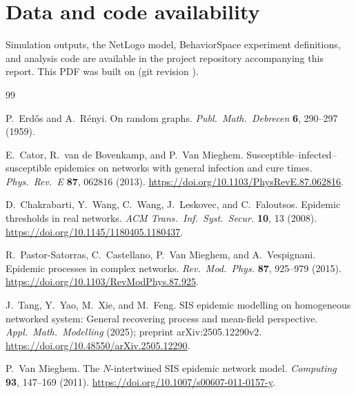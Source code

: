 \documentclass[11pt,a4paper]{article}
\begin{document}
\section*{Data and code availability}
\label{sec:data-availability}
{}

Simulation outputs, the NetLogo model, BehaviorSpace experiment definitions, and analysis code are available in the project repository accompanying this report.
This PDF was built on \RepReportDate{} (git revision \texttt{\RepGitHash}\RepRepoUrlPhrase{}).

\begin{thebibliography}{99}

P.~Erd\H{o}s and A.~R\'enyi.
\newblock On random graphs.
\newblock \emph{Publ.\ Math.\ Debrecen} \textbf{6}, 290--297 (1959).

E.~Cator, R.~van de Bovenkamp, and P.~Van Mieghem.
\newblock Susceptible--infected--susceptible epidemics on networks with general infection and cure times.
\newblock \emph{Phys.\ Rev.\ E} \textbf{87}, 062816 (2013).
\newblock \url{https://doi.org/10.1103/PhysRevE.87.062816}.

D.~Chakrabarti, Y.~Wang, C.~Wang, J.~Leskovec, and C.~Faloutsos.
\newblock Epidemic thresholds in real networks.
\newblock \emph{ACM Trans.\ Inf.\ Syst.\ Secur.} \textbf{10}, 13 (2008).
\newblock \url{https://doi.org/10.1145/1180405.1180437}.


R.~Pastor-Satorras, C.~Castellano, P.~Van Mieghem, and A.~Vespignani.
\newblock Epidemic processes in complex networks.
\newblock \emph{Rev.\ Mod.\ Phys.} \textbf{87}, 925--979 (2015).
\newblock \url{https://doi.org/10.1103/RevModPhys.87.925}.


J.~Tang, Y.~Yao, M.~Xie, and M.~Feng.
\newblock SIS epidemic modelling on homogeneous networked system: General recovering process and mean-field perspective.
\newblock \emph{Appl.\ Math.\ Modelling} (2025); preprint arXiv:2505.12290v2.
\newblock \url{https://doi.org/10.48550/arXiv.2505.12290}.

P.~Van Mieghem.
\newblock The $N$-intertwined SIS epidemic network model.
\newblock \emph{Computing} \textbf{93}, 147--169 (2011).
\newblock \url{https://doi.org/10.1007/s00607-011-0157-y}.

\end{thebibliography}
\end{document}
